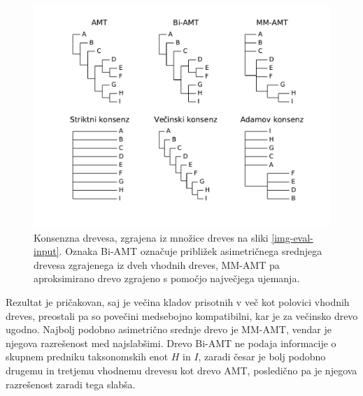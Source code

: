 \documentclass[a4paper, 12pt]{book}
\begin{document}
\begin{figure}[h!]
	\begin{center}
		\includegraphics[scale=0.55, clip=true, trim=1.5cm 1.5cm 1cm 0.8cm]{gfx/eval_gfx.pdf}
	\end{center}
	\caption{
	         Konsenzna drevesa, zgrajena iz množice dreves na sliki \ref{img-eval-input}. Oznaka Bi-AMT označuje 
	         približek asimetričnega srednjega drevesa zgrajenega iz dveh vhodnih dreves, MM-AMT pa aproksimirano 
	         drevo zgrajeno s pomočjo največjega ujemanja.
	    }
	\label{img-eval-result}
\end{figure}

Rezultat je pričakovan, saj je večina kladov prisotnih v več kot polovici vhodnih dreves, preostali pa so povečini
medsebojno kompatibilni, kar je za večinsko drevo ugodno. Najbolj podobno asimetrično srednje drevo je MM-AMT, 
vendar je njegova razrešenost med najslabšimi. Drevo Bi-AMT ne podaja informacije o skupnem predniku taksonomskih 
enot $H$ in $I$, zaradi česar je bolj podobno drugemu in tretjemu vhodnemu drevesu kot drevo AMT, posledično pa je
njegova razrešenost zaradi tega slabša. 
\end{document}
